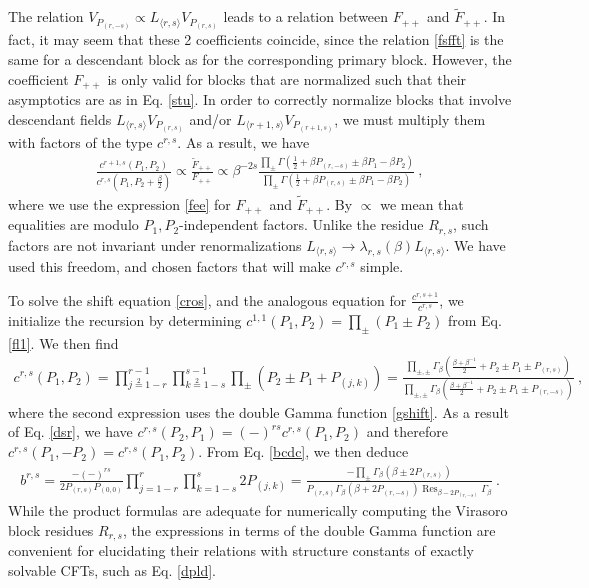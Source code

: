 \documentclass[12pt, a4paper]{article}
\theoremstyle{break}
\begin{document}
The relation $V_{P_{(r,-s)}}\propto L_{\langle r,s\rangle}V_{P_{(r,s)}}$ leads to a relation between $F_{++}$ and $\widetilde{F}_{++}$. In fact, it may seem that these 2 coefficients coincide, since the relation \eqref{fsfft} is the same for a descendant block as for the corresponding primary block. However, the coefficient $F_{++}$ is only valid for blocks that are normalized such that their asymptotics are as in Eq. \eqref{stu}. In order to correctly normalize blocks that involve descendant fields $L_{\langle r,s\rangle}V_{P_{(r,s)}}$ and/or $L_{\langle r+1,s\rangle}V_{P_{(r+1,s)}}$, we must multiply them with factors of the type $c^{r,s}$. As a result, we have 
\begin{align}
 \frac{c^{r+1,s}(P_1,P_2)}{c^{r,s}(P_1,P_2+\frac{\beta}{2})} \propto \frac{\widetilde{F}_{++}}{F_{++}} \propto \beta^{-2s}\frac{\prod_{\pm} \Gamma(\frac12+\beta P_{(r,-s)} \pm \beta P_1 -\beta P_2)}{\prod_{\pm} \Gamma(\frac12+\beta P_{(r,s)} \pm \beta P_1 -\beta P_2)} \ , 
 \label{cros}
\end{align}
where we use the expression \eqref{fee} for $F_{++}$ and $\widetilde{F}_{++}$. By $\propto$ we mean that equalities are modulo $P_1,P_2$-independent factors. Unlike the residue $R_{r,s}$, such factors are not invariant under renormalizations $L_{\langle r,s\rangle} \to \lambda_{r,s}(\beta)L_{\langle r,s\rangle}$. We have used this freedom, and chosen factors that will make $c^{r,s}$ simple. 

To solve the shift equation \eqref{cros}, and the analogous equation for $\frac{c^{r,s+1}}{c ^{r,s}}$, we initialize the recursion by determining $c^{1,1}(P_1,P_2) =\prod_\pm (P_1\pm P_2) $ from Eq. \eqref{fl1}. We then find 
\begin{align}
 \boxed{c^{r,s}(P_1,P_2) = \prod_{j\overset{2}{=}1-r}^{r-1} \prod_{k\overset{2}{=}1-s}^{s-1} \prod_\pm \left(P_2\pm P_1+ P_{(j,k)}\right) = \frac{\prod_{\pm,\pm}\Gamma_\beta\left(\frac{\beta+\beta^{-1}}{2} +P_2\pm P_1 \pm P_{(r,s)}\right)}
 {\prod_{\pm,\pm}\Gamma_\beta\left(\frac{\beta+\beta^{-1}}{2} +P_2\pm P_1 \pm P_{(r,-s)}\right)}}\ , 
 \label{crs}
\end{align}
where the second expression uses the double Gamma function \eqref{gshift}. As a result of Eq. \eqref{dsr}, we have $c^{r,s}(P_2,P_1)=(-)^{rs} c^{r,s}(P_1,P_2)$ and therefore $c^{r,s}(P_1,-P_2)=c^{r,s}(P_1,P_2)$. From Eq. \eqref{bcdc}, we then deduce 
\begin{align}
 \boxed{b^{r,s} = \frac{-(-)^{rs}}{2P_{(r,s)}P_{(0,0)}} \prod_{j=1-r}^r\prod_{k=1-s}^s 2P_{(j,k)} = 
 \frac{-\prod_\pm \Gamma_\beta\left(\beta \pm 2P_{(r,s)}\right)}{P_{(r,s)}\Gamma_\beta\left(\beta+2P_{(r,-s)}\right)\operatorname{Res}_{\beta-2P_{(r,-s)}}\Gamma_\beta}}\ .
 \label{brs}
\end{align}
While the product formulas are adequate for numerically computing the Virasoro block residues $R_{r,s}$, the expressions in terms of the double Gamma function are convenient for elucidating their relations with structure constants of exactly solvable CFTs, such as Eq. \eqref{dpld}.
\end{document}
